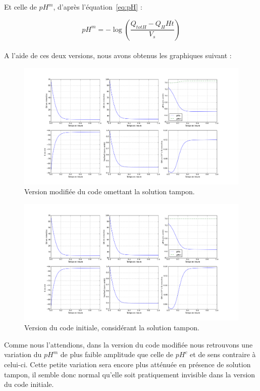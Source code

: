 \documentclass[a4paper,fleqn]{article}
\begin{document}
Et celle de $pH^m$, d'après l'équation~\eqref{eq:pH} :

\begin{equation}
pH^m = -\log\left(\frac{Q_{tot H}-Q_H Ht}{V_s}\right)
\end{equation} \\

A l'aide de ces deux versions, nous avons obtenus les graphiques suivant : 

\begin{figure}[H]
\centering 
\includegraphics[width=1.1\textwidth]{sans_sol_tampon.png}
\caption{Version modifiée du code omettant la solution tampon.}
\end{figure} 

\begin{figure}[H]
\centering 
\includegraphics[width=1.1\textwidth]{avec_sol_tampon.png}
\caption{Version du code initiale, considérant la solution tampon.}
\end{figure} 


Comme nous l'attendions, dans la version du code modifiée nous retrouvons une variation du $pH^m$ de plus faible amplitude que celle de $pH^c$ et de sens contraire à celui-ci. Cette petite variation sera encore plus atténuée en présence de solution tampon, il semble donc normal qu'elle soit pratiquement invisible dans la version du code initiale.\\
\end{document}
